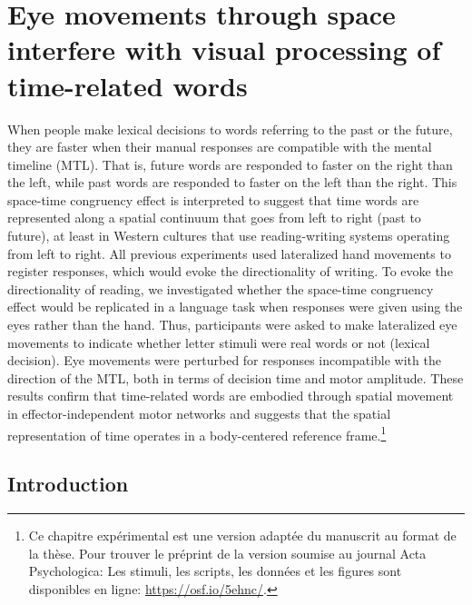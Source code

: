 \documentclass[
  a4paper,12pt,twoside,onecolumn,openright,final,oldfontcommands]{memoir}
\newcommand\chaptercolor{gray}
\newcommand{\changechaptercolor}[1]{
  \renewcommand\chaptercolor{#1}
}
\newcommand{\initial}[1]{
	\lettrine[lines=3,lhang=0.33,nindent=0em]{
		\color{gray}
     		{\textsc{#1}}}{}}
\begin{document}
\changechaptercolor{hokusai4}

\hypertarget{chap4}{%
\chapter{Eye movements through space interfere with visual processing of time-related words}\label{chap4}}

\initial{W}hen people make lexical decisions to words referring to the past or the future, they are faster when their manual responses are compatible with the mental timeline (MTL). That is, future words are responded to faster on the right than the left, while past words are responded to faster on the left than the right. This space-time congruency effect is interpreted to suggest that time words are represented along a spatial continuum that goes from left to right (past to future), at least in Western cultures that use reading-writing systems operating from left to right. All previous experiments used lateralized hand movements to register responses, which would evoke the directionality of writing. To evoke the directionality of reading, we investigated whether the space-time congruency effect would be replicated in a language task when responses were given using the eyes rather than the hand. Thus, participants were asked to make lateralized eye movements to indicate whether letter stimuli were real words or not (lexical decision). Eye movements were perturbed for responses incompatible with the direction of the MTL, both in terms of decision time and motor amplitude. These results confirm that time-related words are embodied through spatial movement in effector-independent motor networks and suggests that the spatial representation of time operates in a body-centered reference frame.\footnote{Ce chapitre expérimental est une version adaptée du manuscrit au format de la thèse. Pour trouver le préprint de la version soumise au journal Acta Psychologica: Les stimuli, les scripts, les données et les figures sont disponibles en ligne: \url{https://osf.io/5ehnc/}.}

\hypertarget{introduction-1}{%
\section{Introduction}\label{introduction-1}}
\end{document}
